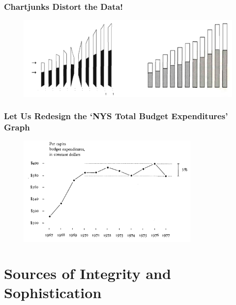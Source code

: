 \documentclass[notes, aspectratio=1610]{beamer}
\begin{document}
\begin{frame}
	\frametitle{Chartjunks Distort the Data!}
	\begin{figure}
		\begin{small}
			\begin{center}
				\includegraphics[width=1\textwidth]{
					images/errors_.png
					}
			\end{center}
		\end{small}
	\end{figure}
\end{frame}

\begin{frame}
	\frametitle{Let Us Redesign the `NYS Total Budget Expenditures' Graph}
	\begin{figure}
		\begin{small}
			\begin{center}
				\includegraphics[width=0.8\textwidth]{
					images/redo_nys_budget.png
					}
			\end{center}
		\end{small}
	\end{figure}
\end{frame}

\section{Sources of Integrity and Sophistication}
\end{document}
